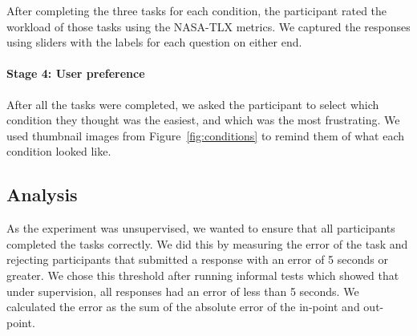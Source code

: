 
After completing the three tasks for each condition, the participant rated the workload of those tasks
using the NASA-TLX metrics. We captured the responses using sliders with the labels for each question on either end.

\paragraph{Stage 4: User preference}
After all the tasks were completed, we asked the participant to select which condition they thought was the easiest,
and which was the most frustrating. We used thumbnail images from Figure~\ref{fig:conditions} to remind them of what
each condition looked like.

\subsection{Analysis}\label{sec:waveform-analysis}
As the experiment was unsupervised, we wanted to ensure that all participants completed the tasks correctly.  We did
this by measuring the error of the task and rejecting participants that submitted a response with an error of 5 seconds
or greater. We chose this threshold after running informal tests which showed that under supervision, all responses had
an error of less than 5 seconds.  We calculated the error as the sum of the absolute error of the in-point and
out-point.

